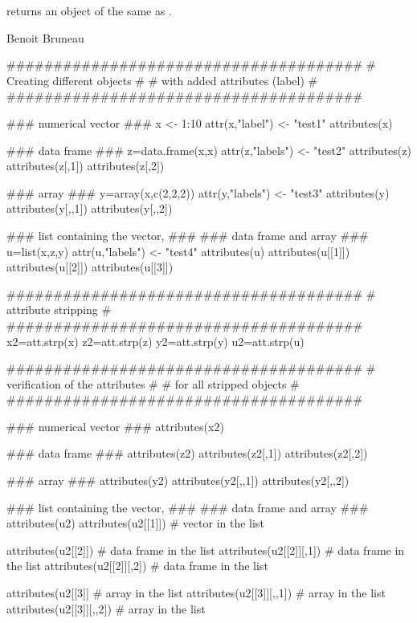 \documentclass[a4paper]{book}
\begin{document}
%
\begin{Value}
returns an object of the same  as .
\end{Value}
%
\begin{Author}\relax
Benoit Bruneau
\end{Author}
%
\begin{Examples}
\begin{ExampleCode}

######################################
#   Creating different objects       #
#    with added attributes (label)   #
######################################

### numerical vector ###
x <- 1:10
attr(x,"label") <- "test1"
attributes(x)

### data frame ###
z=data.frame(x,x)
attr(z,"labels") <- "test2"
attributes(z)
attributes(z[,1])
attributes(z[,2])

### array ###
y=array(x,c(2,2,2))
attr(y,"labels") <- "test3"
attributes(y)
attributes(y[,,1])
attributes(y[,,2])

### list containing the vector, ###
### data frame and array        ###
u=list(x,z,y)
attr(u,"labels") <- "test4"
attributes(u)
attributes(u[[1]])
attributes(u[[2]])
attributes(u[[3]])

######################################
#        attribute stripping         #
######################################
x2=att.strp(x)
z2=att.strp(z)
y2=att.strp(y)
u2=att.strp(u)

######################################
#   verification of the attributes   #
#    for all stripped objects        #
######################################

### numerical vector ###
attributes(x2)

### data frame ###
attributes(z2)
attributes(z2[,1])
attributes(z2[,2])

### array ###
attributes(y2)
attributes(y2[,,1])
attributes(y2[,,2])

### list containing the vector, ###
### data frame and array        ###
attributes(u2)
attributes(u2[[1]])       # vector in the list

attributes(u2[[2]])       # data frame in the list
attributes(u2[[2]][,1])   # data frame in the list
attributes(u2[[2]][,2])   # data frame in the list

attributes(u2[[3]]        # array in the list
attributes(u2[[3]][,,1])  # array in the list
attributes(u2[[3]][,,2])  # array in the list



\end{ExampleCode}
\end{Examples}
\end{document}
